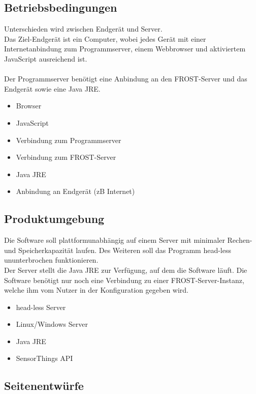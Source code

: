 \documentclass[12 pt]{article}
\begin{document}
	\subsection{Betriebsbedingungen}
	Unterschieden wird zwischen Endgerät und Server. \\
	Das Ziel-Endgerät ist ein Computer, wobei jedes Gerät mit einer Internetanbindung zum Programmserver, einem Webbrowser und aktiviertem JavaScript ausreichend ist.\\
	\ \\
	Der Programmserver benötigt eine Anbindung an den FROST-Server und das Endgerät sowie eine Java JRE.
	\begin{itemize}
		\item Browser
		\item JavaScript
		\item Verbindung zum Programmserver
	\end{itemize}
	\begin{itemize}
		\item Verbindung zum FROST-Server
		\item Java JRE
		\item Anbindung an Endgerät (zB Internet)
	\end{itemize}
	
	\subsection{Produktumgebung}
	Die Software soll plattformunabhängig auf einem Server mit minimaler Rechen- und Speicherkapazität laufen. Des Weiteren soll das Programm head-less ununterbrochen funktionieren.\\ Der Server stellt die Java JRE zur Verfügung, auf dem die Software läuft. Die Software benötigt nur noch eine Verbindung zu einer FROST-Server-Instanz, welche ihm vom Nutzer in der Konfiguration gegeben wird.
	
	\begin{itemize}
		\item head-less Server
		\item Linux/Windows Server
		\item Java JRE
		\item SensorThings API
	\end{itemize}
	
	\subsection{Seitenentwürfe}
	
\end{document}
